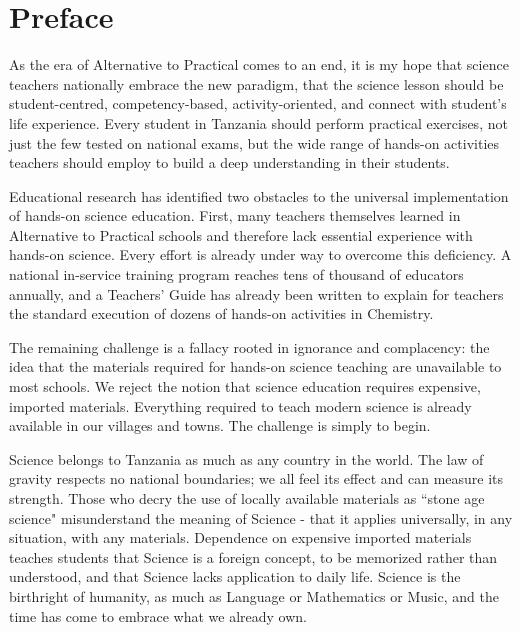 \chapter*{Preface}

As the era of Alternative to Practical comes to an end, it is my hope that science teachers nationally embrace the new paradigm, that the science lesson should be student-centred, competency-based, activity-oriented, and connect with student's life experience. Every student in Tanzania should perform practical exercises, not just the few tested on national exams, but the wide range of hands-on activities teachers should employ to build a deep understanding in their students.

Educational research has identified two obstacles to the universal implementation of hands-on science education. First, many teachers themselves learned in Alternative to Practical schools and therefore lack essential experience with hands-on science. Every effort is already under way to overcome this deficiency. A national in-service training program reaches tens of thousand of educators annually, and a Teachers' Guide has already been written to explain for teachers the standard execution of dozens of hands-on activities in Chemistry.

The remaining challenge is a fallacy rooted in ignorance and complacency: the idea that the materials required for hands-on science teaching are unavailable to most schools. We reject the notion that science education requires expensive, imported materials. Everything required to teach modern science is already available in our villages and towns. The challenge is simply to begin.

Science belongs to Tanzania as much as any country in the world. The law of gravity respects no national boundaries; we all feel its effect and can measure its strength. Those who decry the use of locally available materials as ``stone age science" misunderstand the meaning 
of Science - that it applies universally, in any situation, with any materials. Dependence on expensive imported materials teaches students that Science is a foreign concept, to be memorized rather than understood, and that Science lacks application to daily life. Science is the birthright of humanity, as much as Language or Mathematics or Music, and the time has come to embrace what we already own.

